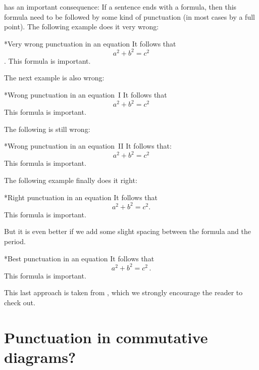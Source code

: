  has an important consequence:
If a sentence ends with a formula, then this formula need to be followed by some kind of punctuation (in most cases by a full point).
The following example does it very wrong:
\begin{showlatex}*{Very wrong punctuation in an equation}
It follows that
\[
  a^2 + b^2 = c^2
\]
.
This formula is important.
\end{showlatex}
The next example is also wrong:
\begin{showlatex}*{Wrong punctuation in an equation~I}
It follows that
\[
  a^2 + b^2 = c^2
\]
This formula is important.
\end{showlatex}
The following is still wrong:
\begin{showlatex}*{Wrong punctuation in an equation~II}
It follows that:
\[
  a^2 + b^2 = c^2
\]
This formula is important.
\end{showlatex}
The following example finally does it right:
\begin{showlatex}*{Right punctuation in an equation}
It follows that
\[
  a^2 + b^2 = c^2.
\]
This formula is important.
\end{showlatex}
But it is even better if we add some slight spacing between the formula and the period.
\begin{showlatex}*{Best punctuation in an equation}
It follows that
\[
  a^2 + b^2 = c^2 \,.
\]
This formula is important.
\end{showlatex}
This last approach is taken from \cite{tex_period}, which we strongly encourage the reader to check out.






\section{Punctuation in commutative diagrams?}

